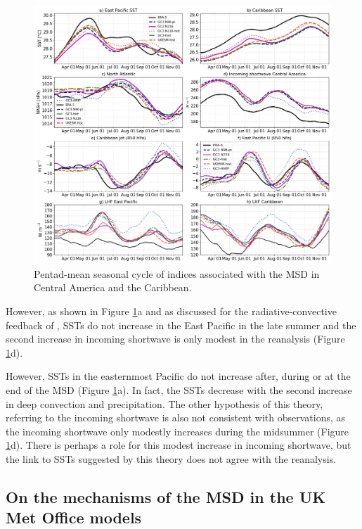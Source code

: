  \begin{figure}[t!]
\includegraphics[width=\linewidth]{figures/CSST}
\caption{Pentad-mean seasonal cycle of indices associated with the MSD in Central America and the Caribbean.}
\label{fig:csst}
\end{figure}


However, as shown in Figure \ref{fig:csst}a and as discussed for the radiative-convective feedback of \cite{magana1999}, SSTs do not increase in the East Pacific in the late summer and the second increase in incoming shortwave is only modest in the reanalysis (Figure \ref{fig:csst}d). 

 However, SSTs in the easternmost Pacific do not increase after, during or at the end of the MSD (Figure \ref{fig:csst}a). 
In fact, the SSTs decrease with the second increase in deep convection and precipitation. The other hypothesis of this theory, referring to the incoming shortwave is also not consistent with observations, as the incoming shortwave only modestly increases during the midsummer (Figure \ref{fig:csst}d). There is perhaps a role for this modest increase in incoming shortwave, but the link to SSTs suggested by this theory does not agree with the reanalysis. 

\subsection{ On the mechanisms of the MSD in the UK Met Office models}
\label{sq:chap3}

